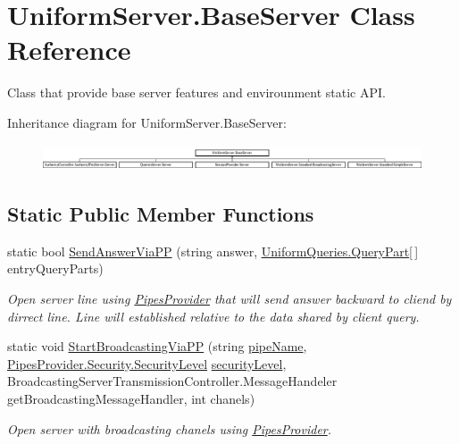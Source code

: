 \hypertarget{class_uniform_server_1_1_base_server}{}\section{Uniform\+Server.\+Base\+Server Class Reference}
\label{class_uniform_server_1_1_base_server}


Class that provide base server features and envirounment static A\+PI.  


Inheritance diagram for Uniform\+Server.\+Base\+Server\+:\begin{figure}[H]
\begin{center}
\leavevmode
\includegraphics[height=0.780488cm]{d7/d32/class_uniform_server_1_1_base_server}
\end{center}
\end{figure}
\subsection*{Static Public Member Functions}
\begin{DoxyCompactItemize}
\item 
static bool \mbox{\hyperlink{class_uniform_server_1_1_base_server_aefbb2a4287a7f995582b2abf41da8a89}{Send\+Answer\+Via\+PP}} (string answer, \mbox{\hyperlink{struct_uniform_queries_1_1_query_part}{Uniform\+Queries.\+Query\+Part}}\mbox{[}$\,$\mbox{]} entry\+Query\+Parts)
\begin{DoxyCompactList}\small\item\em Open server line using \mbox{\hyperlink{namespace_pipes_provider}{Pipes\+Provider}} that will send answer backward to cliend by dirrect line. Line will established relative to the data shared by client query. \end{DoxyCompactList}\item 
static void \mbox{\hyperlink{class_uniform_server_1_1_base_server_a9ca20516e2a562ddbf8d2c1866f90b25}{Start\+Broadcasting\+Via\+PP}} (string \mbox{\hyperlink{class_uniform_server_1_1_base_server_aaa318b3ed503dd8ccf381c9f3a81ecf2}{pipe\+Name}}, \mbox{\hyperlink{namespace_pipes_provider_1_1_security_a1a6020eca1c661a6f7140e8260502d7e}{Pipes\+Provider.\+Security.\+Security\+Level}} \mbox{\hyperlink{class_uniform_server_1_1_base_server_ac6297faa957fd1005fc61054bdd1cdb1}{security\+Level}}, Broadcasting\+Server\+Transmission\+Controller.\+Message\+Handeler get\+Broadcasting\+Message\+Handler, int chanels)
\begin{DoxyCompactList}\small\item\em Open server with broadcasting chanels using \mbox{\hyperlink{namespace_pipes_provider}{Pipes\+Provider}}. \end{DoxyCompactList}\end{DoxyCompactItemize}

